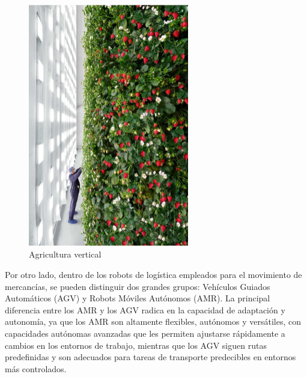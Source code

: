 \begin{itemize}
 \begin{figure} [H]
  \begin{center}
    \includegraphics[width=70mm]{figs/agricultura vertical 1.png}
  \end{center}
  \caption{Agricultura vertical}
  \label{fig:agricultura_vertical}
 \end{figure}
 
Por otro lado, dentro de los robots de logística empleados para el movimiento de mercancías, se pueden distinguir dos grandes grupos: Vehículos Guiados Automáticos (AGV) y Robots Móviles Autónomos (AMR). La principal diferencia entre los AMR y los AGV radica en la capacidad de adaptación y autonomía, ya que los AMR son altamente flexibles, autónomos y versátiles, con capacidades autónomas avanzadas que les permiten ajustarse rápidamente a cambios en los entornos de trabajo, mientras que los AGV siguen rutas predefinidas y son adecuados para tareas de transporte predecibles en entornos más controlados.
 

\end{itemize}

